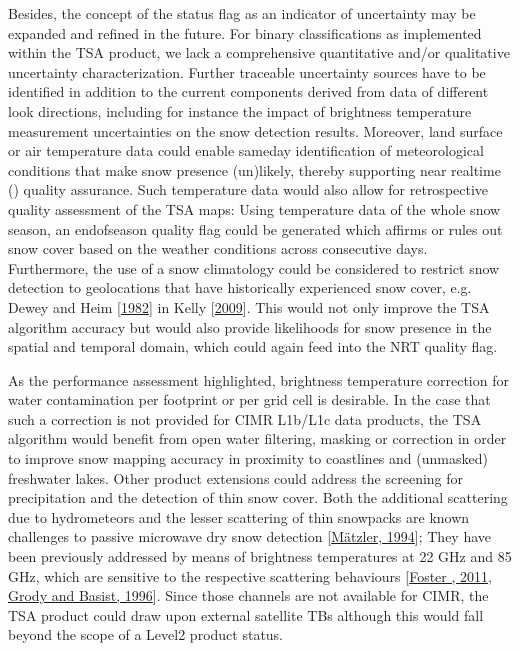 \documentclass[letterpaper,10pt,english]{jupyterBook}
\begin{document}
\sphinxAtStartPar
Besides, the concept of the status flag as an indicator of uncertainty may be expanded and refined in the future.
For binary classifications as implemented within the TSA product, we lack a comprehensive quantitative and/or qualitative uncertainty characterization.
Further traceable uncertainty sources have to be identified in addition to the current components derived from {\hyperref[\detokenize{book/acronyms:term-TB}]{}} data of different look directions, including for instance the impact of brightness temperature measurement uncertainties on the snow detection results.
Moreover, land surface or air temperature data could enable same\sphinxhyphen{}day identification of meteorological conditions that make snow presence (un)likely, thereby supporting near real\sphinxhyphen{}time ({\hyperref[\detokenize{book/acronyms:term-NRT}]{}}) quality assurance.
Such temperature data would also allow for retrospective quality assessment of the TSA maps: Using temperature data of the whole snow season, an end\sphinxhyphen{}of\sphinxhyphen{}season quality flag could be generated which affirms or rules out snow cover based on the weather conditions across consecutive days.
Furthermore, the use of a snow climatology could be considered to restrict snow detection to geolocations that have historically experienced snow cover, e.g. Dewey and Heim {[}\hyperlink{cite.book/references:id20}{1982}{]} in Kelly {[}\hyperlink{cite.book/references:id12}{2009}{]}.
This would not only improve the TSA algorithm accuracy but would also provide likelihoods for snow presence in the spatial and temporal domain, which could again feed into the NRT quality flag.

\sphinxAtStartPar
As the performance assessment highlighted, brightness temperature correction for water contamination per footprint or per grid cell is desirable.
In the case that such a correction is not provided for CIMR L1b/L1c data products, the TSA algorithm would benefit from open water filtering, masking or correction in order to improve snow mapping accuracy in proximity to coastlines and (unmasked) freshwater lakes.
Other product extensions could address the screening for precipitation and the detection of thin snow cover.
Both the additional scattering due to hydrometeors and the lesser scattering of thin snowpacks are known challenges to passive microwave dry snow detection {[}\hyperlink{cite.book/references:id13}{Mätzler, 1994}{]};
They have been previously addressed by means of brightness temperatures at 22 GHz and 85 GHz, which are sensitive to the respective scattering behaviours {[}\hyperlink{cite.book/references:id21}{Foster , 2011}, \hyperlink{cite.book/references:id9}{Grody and Basist, 1996}{]}.
Since those channels are not available for CIMR, the TSA product could draw upon external satellite TBs although this would fall beyond the scope of a Level\sphinxhyphen{}2 product status.
\end{document}
